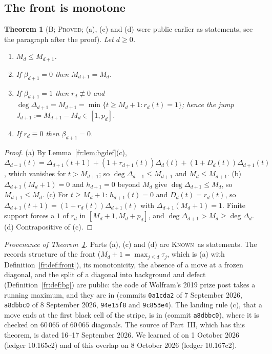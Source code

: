 \documentclass[11pt]{article}
\newtheorem{theorem}{Theorem}[section]
\theoremstyle{definition}
\theoremstyle{remark}
\newcommand{\PROVED}{\textsc{Proved}}
\newcommand{\KNOWN}{\textsc{Known}}
\begin{document}
\subsection{The front is monotone}

\begin{theorem}[B; \PROVED; (a), (c) and (d) were public earlier as statements, see the paragraph after the proof]\label{fr:thm:B}
Let $d\ge0$.
\begin{enumerate}
\item[(a)] $M_d\le M_{d+1}$.
\item[(b)] If $\beta_{d+1}=0$ then $M_{d+1}=M_d$.
\item[(c)] If $\beta_{d+1}=1$ then $r_d\not\equiv0$ and
$\deg\Delta_{d+1}=M_{d+1}=\min\{t\ge M_d+1:r_d(t)=1\}$; hence the jump
$J_{d+1}:=M_{d+1}-M_d\in[1,p_d]$.
\item[(d)] If $r_d\equiv0$ then $\beta_{d+1}=0$.
\end{enumerate}
\end{theorem}
\begin{proof}
(a) By Lemma~\ref{fr:lem:bgdef}(c),
$\Delta_{d-1}(t)=\Delta_{d+1}(t+1)+(1+r_{d+1}(t))\Delta_d(t)+(1+D_d(t))\Delta_{d+1}(t)$,
which vanishes for $t>M_{d+1}$; so $\deg\Delta_{d-1}\le M_{d+1}$ and $M_d\le M_{d+1}$.
(b) $\Delta_{d+1}(M_d+1)=0$ and $h_{d+1}=0$ beyond $M_d$ give $\deg\Delta_{d+1}\le M_d$, so $M_{d+1}\le M_d$.
(c) For $t\ge M_d+1$: $h_{d+1}(t)=0$ and $D_d(t)=r_d(t)$, so
$\Delta_{d+1}(t+1)=(1+r_d(t))\Delta_{d+1}(t)$ with $\Delta_{d+1}(M_d+1)=1$. Finite support forces a
$1$ of $r_d$ in $[M_d+1,M_d+p_d]$, and $\deg\Delta_{d+1}>M_d\ge\deg\Delta_d$.
(d) Contrapositive of (c).
\end{proof}

\noindent\emph{Provenance of Theorem~\ref{fr:thm:B}.} Parts (a), (c) and (d) are \KNOWN\ as statements. The records structure of the front ($M_d+1=\max_{j\le d}\tau_j$, which is (a) with Definition~\ref{fr:def:front}), its monotonicity, the absence of a move at a frozen diagonal, and the split of a diagonal into background and defect (Definition~\ref{fr:def:bg}) are public: the code of Wolfram's 2019 prize post \cite{Wolfram19} takes a running maximum, and they are in \cite{Dib} (commits \texttt{0a1cda2} of 7 September 2026, \texttt{a8dbbc0} of 8 September 2026, \texttt{94e15f8} and \texttt{9c853e4}). The landing rule (c), that a move ends at the first black cell of the stripe, is in \cite{Dib} (commit \texttt{a8dbbc0}), where it is checked on $60\,065$ of $60\,065$ diagonals. The source of Part~III, which has this theorem, is dated 16--17 September 2026. We learned of \cite{Dib} on 1 October 2026 (ledger 10.165c2) and of this overlap on 8 October 2026 (ledger 10.167c2).
\end{document}
